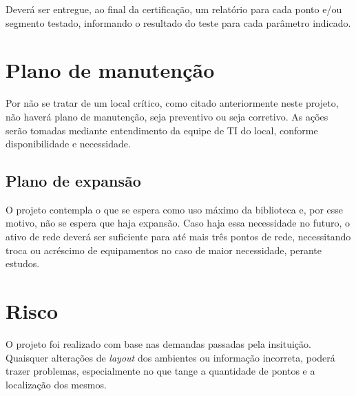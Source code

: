\documentclass[	DIV=calc,%
							paper=a4,%
							fontsize=12pt,%
							onecolumn]{scrartcl}	 					%
\begin{document}
Deverá ser entregue, ao final da certificação, um relatório para cada ponto e/ou segmento testado, informando o resultado do teste para cada parâmetro indicado.

\section{Plano de manutenção}
Por não se tratar de um local crítico, como citado anteriormente neste projeto, não haverá plano de manutenção, seja preventivo ou seja corretivo. As ações serão tomadas mediante entendimento da equipe de TI do local, conforme disponibilidade e necessidade.

\subsection{Plano de expansão}
O projeto contempla o que se espera como uso máximo da biblioteca e, por esse motivo, não se espera que haja expansão. Caso haja essa necessidade no futuro, o ativo de rede deverá ser suficiente para até mais três pontos de rede, necessitando troca ou acréscimo de equipamentos no caso de maior necessidade, perante estudos.

\section{Risco}
O projeto foi realizado com base nas demandas passadas pela insituição. Quaisquer alterações de \textit{layout} dos ambientes ou informação incorreta, poderá trazer problemas, especialmente no que tange a quantidade de pontos e a localização dos mesmos.
\end{document}
